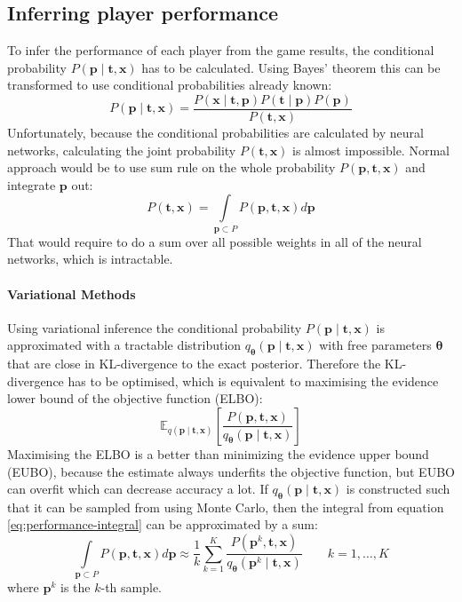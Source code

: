 \documentclass[12pt,a4paper]{book}
\newcommand\bs[1]{\boldsymbol{#1}}
\begin{document}
\subsection{Inferring player performance}
To infer the performance of each player from the game results, the conditional probability $P(\bs{p}\mid\bs{t},\bs{x})$ has to be calculated.
Using Bayes' theorem this can be transformed to use conditional probabilities already known:
\begin{equation}
P(\bs{p}\mid\bs{t},\bs{x}) = \frac{P(\bs{x}\mid\bs{t},\bs{p})P(\bs{t}\mid\bs{p})P(\bs{p})}{P(\bs{t},\bs{x})}
\end{equation}
Unfortunately, because the conditional probabilities are calculated by neural networks, calculating the joint probability $P(\bs{t},\bs{x})$ is almost impossible.
Normal approach would be to use sum rule on the whole probability $P(\bs{p},\bs{t},\bs{x})$ and integrate $\bs{p}$ out:
\begin{equation}
P(\bs{t},\bs{x})=\int\limits_{\bs{p}\subset P} P(\bs{p},\bs{t},\bs{x}) d\bs{p}
\label{eq:performance-integral}
\end{equation}
That would require to do a sum over all possible weights in all of the neural networks, which is intractable. 

\paragraph{Variational Methods}
Using variational inference the conditional probability $P(\bs{p}\mid\bs{t},\bs{x})$ is approximated with a tractable distribution $q_{\bs{\theta}}(\bs{p}\mid\bs{t},\bs{x})$ with free parameters $\bs{\theta}$ that are close in KL-divergence to the exact posterior.
Therefore the KL-divergence has to be optimised, which is equivalent to maximising the evidence lower bound of the objective function (ELBO):
\begin{equation}
\mathbb{E}_{q(\bs{p}\mid\bs{t},\bs{x})}\left[\frac{P(\bs{p},\bs{t},\bs{x})}{q_{\bs{\theta}}(\bs{p}\mid\bs{t},\bs{x})}\right]
\label{eq:KL-divergence}
\end{equation}
Maximising the ELBO is a better than minimizing the evidence upper bound (EUBO), because the estimate always underfits the objective function, but EUBO can overfit which can decrease accuracy a lot.
If $q_{\bs{\theta}}(\bs{p}\mid\bs{t},\bs{x})$ is constructed such that it can be sampled from using Monte Carlo, then the integral from equation \ref{eq:performance-integral} can be approximated by a sum:
\begin{equation}
\int\limits_{\bs{p}\subset P} P(\bs{p},\bs{t},\bs{x}) d\bs{p} \approx \frac{1}{k}\sum\limits_{k=1}^{K}\frac{P(\bs{p}^k,\bs{t},\bs{x})}{q_{\bs{\theta}}(\bs{p}^k\mid\bs{t},\bs{x})} \qquad k=1,\dots,K
\end{equation}
where $\bs{p}^k$ is the $k$-th sample.
\end{document}

